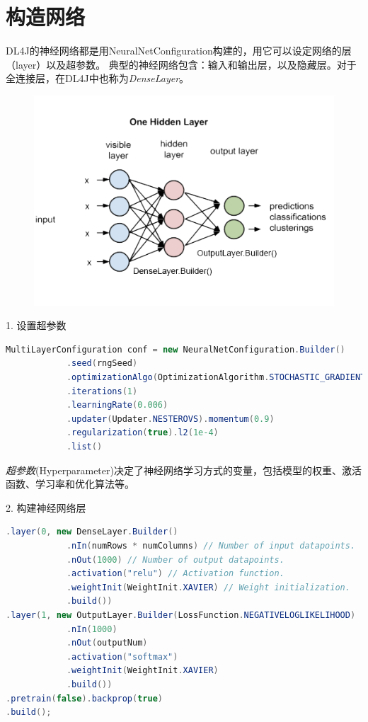 \section{构造网络}
DL4J的神经网络都是用NeuralNetConfiguration构建的，用它可以设定网络的层（layer）以及超参数。
典型的神经网络包含：输入和输出层，以及隐藏层。对于全连接层，在DL4J中也称为\emph{DenseLayer}。

\begin{figure}[!htb]
\centerline{\includegraphics[width=.35\figwidth]{images/onelayer_labeled.png}}
\label{fig:part3_dl4j_onelayer}
\end{figure}


1. 设置超参数
\begin{lstlisting}[language=Java]
MultiLayerConfiguration conf = new NeuralNetConfiguration.Builder()
            .seed(rngSeed)
            .optimizationAlgo(OptimizationAlgorithm.STOCHASTIC_GRADIENT_DESCENT)
            .iterations(1)
            .learningRate(0.006)
            .updater(Updater.NESTEROVS).momentum(0.9)
            .regularization(true).l2(1e-4)
            .list()
\end{lstlisting}
\emph{超参数}(Hyperparameter)决定了神经网络学习方式的变量，包括模型的权重、激活函数、学习率和优化算法等。
\vspace{0.3cm}

2. 构建神经网络层
\begin{lstlisting}[language=Java]
.layer(0, new DenseLayer.Builder()
            .nIn(numRows * numColumns) // Number of input datapoints.
            .nOut(1000) // Number of output datapoints.
            .activation("relu") // Activation function.
            .weightInit(WeightInit.XAVIER) // Weight initialization.
            .build())
.layer(1, new OutputLayer.Builder(LossFunction.NEGATIVELOGLIKELIHOOD)
            .nIn(1000)
            .nOut(outputNum)
            .activation("softmax")
            .weightInit(WeightInit.XAVIER)
            .build())
.pretrain(false).backprop(true)
.build();
\end{lstlisting}

